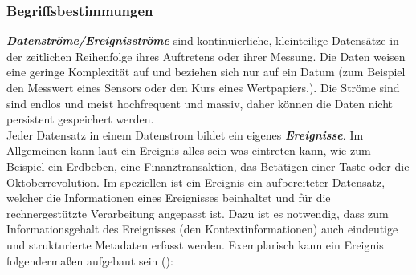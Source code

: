 \documentclass{acm_proc_article-sp}
\begin{document}
\subsubsection{Begriffsbestimmungen}\label{begriffsbestimmung}
\vspace{0.1cm}
\textbf{\textit{Datenströme/Ereignisströme}}
sind kontinuierliche, kleinteilige Datensätze in der 
zeitlichen Reihenfolge ihres Auftretens oder ihrer Messung. Die Daten weisen eine geringe 
Komplexität auf und beziehen sich nur auf ein Datum (zum Beispiel den Messwert eines 
Sensors oder den Kurs eines Wertpapiers.). Die Ströme sind sind endlos und meist 
hochfrequent und massiv, daher können die Daten nicht persistent gespeichert werden.\\
Jeder Datensatz in einem Datenstrom bildet ein eigenes 
\textbf{\textit{Ereignisse}}. Im 
Allgemeinen kann laut \cite{glossary} ein Ereignis alles sein was eintreten kann, wie zum 
Beispiel ein Erdbeben, eine Finanztransaktion, das Betätigen einer Taste oder die 
Oktoberrevolution. Im speziellen ist ein Ereignis ein aufbereiteter Datensatz, welcher 
die Informationen eines Ereignisses beinhaltet und für die rechnergestützte Verarbeitung 
angepasst ist. Dazu ist es notwendig, dass zum Informationsgehalt des Ereignisses (den 
Kontextinformationen) auch eindeutige und strukturierte Metadaten erfasst werden. 
Exemplarisch 
kann ein Ereignis folgendermaßen aufgebaut sein (\cite{hedtstuck}):
\end{document}
